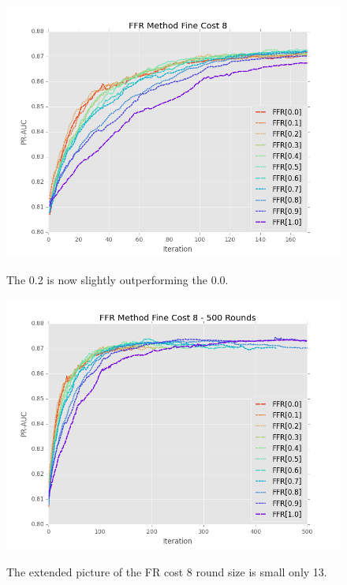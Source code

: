 \documentclass[ms]{nuthesis}
\begin{document}
\FloatBarrier
\begin{figure}[!htb]
	\centering
    \includegraphics[width=1.0\columnwidth]{fig/FFR_PR_Cost8_rnds0_171}
    \label{fig:FFR_PR_Cost8_rnds0_171}
    \caption{The 0.2 is now slightly outperforming the 0.0.}
\end{figure}
\FloatBarrier


\FloatBarrier
\begin{figure}[!htb]
	\centering
    \includegraphics[width=1.0\columnwidth]{fig/FFR_PR_Cost8_rnds0_500}
    \label{fig:FFR_PR_Cost8_rnds0_500}
    \caption{The extended picture of the FR cost 8 round size is small only 13.}
\end{figure}
\FloatBarrier
\end{document}
